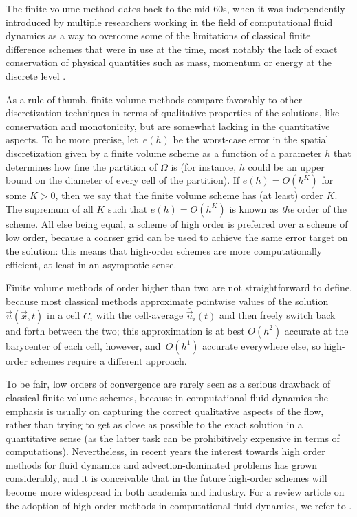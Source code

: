 The finite volume method dates back to the mid-60s, when it was independently
introduced by multiple researchers working in the field of computational
fluid dynamics as a way to overcome some of the limitations of classical
finite difference schemes that were in use at the time, most notably the
lack of exact conservation of physical quantities such as mass, momentum
or energy at the discrete level \cite{runchal2013emergence}
\cite{mcdonald1971computation} \cite{maccormack1972computational}.

As a rule of thumb, finite volume methods compare favorably to other
discretization techniques in terms of qualitative properties of the solutions,
like conservation and monotonicity, but are somewhat lacking in the
quantitative aspects.
To be more precise, let~$e(h)$ be the worst-case error in the spatial
discretization given by a finite volume scheme as a function of a parameter
$h$ that determines how fine the partition of $\Omega$ is (for instance,
$h$ could be an upper bound on the diameter of every cell of the partition).
If $e(h) = O(h^K)$ for some $K > 0$, then we say that the finite volume scheme
has (at least) order $K$. The supremum of all $K$ such that $e(h) = O(h^K)$
is known as \emph{the} order of the scheme.
All else being equal, a scheme of high order is preferred over a scheme
of low order, because a coarser grid can be used to achieve the same
error target on the solution: this means that high-order schemes are more
computationally efficient, at least in an asymptotic sense.

Finite volume methods of order higher than two are not straightforward
to define, because most classical methods approximate pointwise values
of the solution $\vec{u}(\vec{x},t)$ in a cell $C_i$ with the cell-average
$\bar{\vec{u}}_i(t)$ and then freely switch back and forth between the two;
this approximation is at best $O(h^2)$ accurate at the barycenter of each cell,
however, and~$O(h^1)$ accurate everywhere else, so high-order schemes require
a different approach.

To be fair, low orders of convergence are rarely seen as a serious
drawback of classical finite volume schemes, because in computational
fluid dynamics the emphasis is usually on capturing the correct qualitative
aspects of the flow, rather than trying to get as close as possible to the
exact solution in a quantitative sense (as the latter task can be 
prohibitively expensive in terms of computations).
Nevertheless, in recent years the interest towards high order
methods for fluid dynamics and advection-dominated problems
has grown considerably, and it is conceivable that in the future
high-order schemes will become more widespread in both academia and industry.
For a review article on the adoption of high-order methods in computational
fluid dynamics, we refer to \cite{vincent2011facilitating}.

